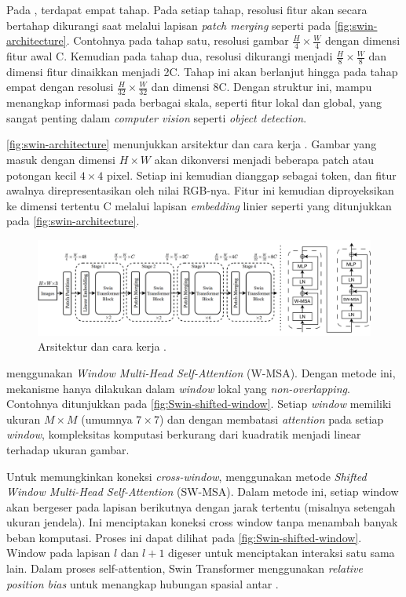 \pagebreak Pada \swin, terdapat empat tahap. Pada setiap tahap, resolusi fitur akan secara bertahap dikurangi saat melalui lapisan \emph{patch merging} seperti pada \autoref{fig:swin-architecture}. Contohnya pada tahap satu, resolusi gambar $\frac{H}{4} \times \frac{W}{4}$ dengan dimensi fitur awal C. Kemudian pada tahap dua, resolusi dikurangi menjadi $\frac{H}{8} \times \frac{W}{8}$ dan 
dimensi fitur dinaikkan menjadi 2C. Tahap ini akan berlanjut hingga pada tahap empat dengan resolusi $\frac{H}{32} \times \frac{W}{32}$ dan dimensi 8C. Dengan struktur ini, \swin{} mampu menangkap informasi pada berbagai skala, seperti fitur lokal 
dan global, yang sangat penting dalam \emph{computer vision} seperti \emph{object detection}. 

\autoref{fig:swin-architecture} menunjukkan arsitektur dan cara kerja \swin. Gambar yang masuk dengan dimensi $H \times W$ akan dikonversi menjadi beberapa patch atau potongan kecil $4 \times 4$ pixel. Setiap \patch{} ini kemudian dianggap sebagai token, dan fitur awalnya direpresentasikan oleh nilai RGB-nya. Fitur ini kemudian 
diproyeksikan ke dimensi tertentu C melalui lapisan \emph{embedding} linier seperti yang ditunjukkan pada \autoref{fig:swin-architecture}.

\begin{figure}[htbp]
    \centering
    \includegraphics[width=1\textwidth]{images/swin-architecture.png}
    \caption{Arsitektur dan cara kerja \swin{} \parencite{liu2021swin}.}
    \label{fig:swin-architecture}
\end{figure}

\swin{} menggunakan \emph{Window Multi-Head Self-Attention} (W-MSA). Dengan metode ini, mekanisme \selfattention{} hanya dilakukan dalam \emph{window} lokal yang \emph{non-overlapping}. Contohnya ditunjukkan pada \autoref{fig:Swin-shifted-window}. 
Setiap \emph{window} memiliki ukuran $M \times M$ (umumnya $7 \times 7$) dan dengan membatasi \emph{attention} pada setiap \emph{window}, kompleksitas komputasi berkurang dari kuadratik menjadi linear terhadap ukuran gambar.

Untuk memungkinkan koneksi \emph{cross-window}, \swin{} 
menggunakan metode \emph{Shifted Window Multi-Head Self-Attention} (SW-MSA). 
Dalam metode ini, setiap window akan bergeser pada lapisan berikutnya dengan jarak tertentu (misalnya setengah ukuran jendela). Ini menciptakan koneksi cross window tanpa menambah banyak beban komputasi. Proses ini dapat dilihat pada \autoref{fig:Swin-shifted-window}. Window pada lapisan $l$ dan $l+1$ digeser untuk menciptakan interaksi 
satu sama lain. Dalam proses self-attention, Swin Transformer menggunakan \textit{relative position bias} untuk menangkap hubungan spasial antar \patch{}.
